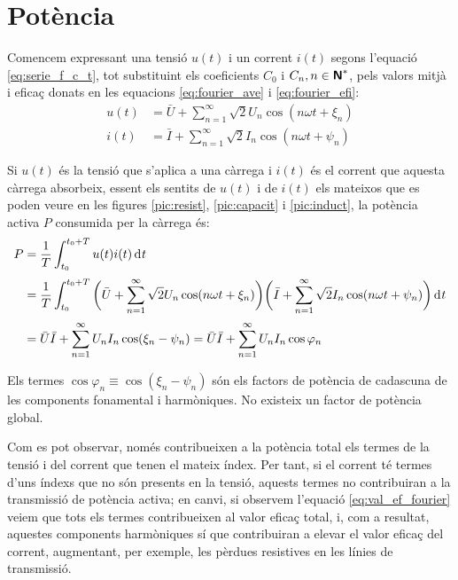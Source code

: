 \section{Potència}

Comencem expressant una tensió $u(t)$ i un corrent $i(t)$
 segons l'equació \eqref{eq:serie_f_c_t}, tot substituint els
 coeficients $C_0$ i $C_n, n \in {\ensuremath{\boldsymbol{\mathsf{N}}}}^*$, pels valors mitjà i eficaç
 donats en les equacions \eqref{eq:fourier_ave} i \eqref{eq:fourier_efi}:
 \begin{align}
    u(t)  &= \bar{U} + \sum_{n=1}^\infty \sqrt{2} U_n \cos (n \omega t +
    \xi_n)\\[0.5ex]
    i(t)  &= \bar{I} + \sum_{n=1}^\infty \sqrt{2} I_n \cos (n \omega t + \psi_n)
 \end{align}

Si  $u(t)$ és la tensió que s'aplica a una càrrega i $i(t)$ és el
corrent que aquesta càrrega absorbeix, essent els sentits de $u(t)$
i de $i(t)$ els mateixos que es poden veure en les figures
\ref{pic:resist}, \ref{pic:capacit} i \ref{pic:induct}, la potència
activa $P$ consumida per la càrrega és:
\begin{equation}\begin{split}
    P &= \frac{1}{T} \int_{t_0}^{t_0+T} u(t) i(t) \diff t 
    \\[0.5ex]
     &= \frac{1}{T} \int_{t_0}^{t_0+T} \bigg(\bar{U} + \sum_{n=1}^\infty
    \sqrt{2} U_n \cos (n \omega t + \xi_n) \bigg)
    \bigg(\bar{I} + \sum_{n=1}^\infty \sqrt{2} I_n
    \cos (n \omega t + \psi_n)\bigg) \diff t\\[0.5ex]
    &=\bar{U} \bar{I} + \sum_{n=1}^\infty U_n I_n
    \cos(\xi_n-\psi_n) = \bar{U} \bar{I} + \sum_{n=1}^\infty U_n I_n
    \cos \varphi_n \label{eq:pot_fu}
\end{split}\end{equation}

Els termes $\cos \varphi_n \equiv \cos (\xi_n-\psi_n)$ són els factors de
potència de cadascuna de les components fonamental i harmòniques. No
existeix un factor de potència global.

 Com es pot observar, només contribueixen a la potència
total els termes de la tensió i del corrent que tenen el mateix
índex. Per tant, si el corrent té termes d'uns índexs que no són
presents en la tensió, aquests termes no contribuiran a la
transmissió de  potència activa; en canvi, si observem l'equació
\eqref{eq:val_ef_fourier} veiem que tots els termes contribueixen al
valor eficaç total, i, com a resultat, aquestes components harmòniques sí que
contribuiran a elevar el valor eficaç del corrent, augmentant, per exemple, 
 les pèrdues resistives en les línies de transmissió.

